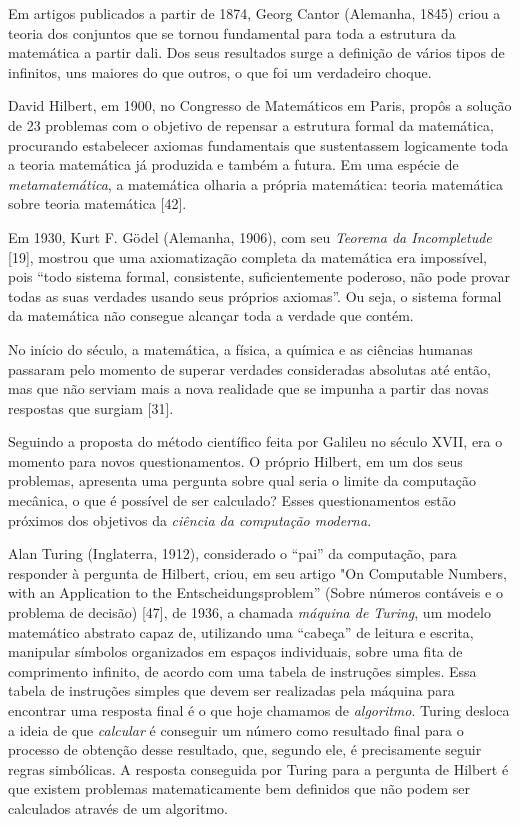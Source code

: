 \documentclass{hipatia}
\begin{document}
Em artigos publicados a partir de 1874, Georg Cantor (Alemanha, 1845) criou a teoria dos conjuntos que se tornou fundamental para toda a estrutura da matemática a partir dali. Dos seus resultados surge a definição de vários tipos de infinitos, uns maiores do que outros, o que foi um verdadeiro choque.

David Hilbert, em 1900, no Congresso de Matemáticos em Paris, propôs a solução de 23 problemas com o objetivo de repensar a estrutura formal da matemática, procurando estabelecer axiomas fundamentais que sustentassem logicamente toda a teoria matemática já produzida e também a futura. Em uma espécie de \textit{metamatemática}, a matemática olharia a própria matemática: teoria matemática sobre teoria matemática [42].

Em 1930, Kurt F. Gödel (Alemanha, 1906), com seu \textit{Teorema da Incompletude} [19], mostrou que uma axiomatização completa da matemática era impossível, pois ``todo sistema formal, consistente, suficientemente poderoso, não pode provar todas as suas verdades usando seus próprios axiomas''. Ou seja, o sistema formal da matemática não consegue alcançar toda a verdade que contém. 

No início do século, a matemática, a física, a química e as ciências humanas passaram pelo momento de superar verdades consideradas absolutas até então, mas que não serviam mais a nova realidade que se impunha a partir das novas respostas que surgiam [31].

Seguindo a proposta do método científico feita por Galileu no século XVII, era o momento para novos questionamentos. O próprio Hilbert, em um dos seus problemas, apresenta uma pergunta  sobre qual seria o limite da computação mecânica, o que é possível de ser calculado? Esses questionamentos estão próximos dos objetivos da \textit{ciência da computação moderna}.

Alan Turing (Inglaterra, 1912), considerado o ``pai'' da computação, para responder à pergunta de Hilbert, criou, em seu artigo "On Computable Numbers, with an Application to the Entscheidungsproblem'' (Sobre números contáveis e o problema de decisão) [47], de 1936, a chamada \textit{máquina de Turing}, um modelo matemático abstrato capaz de, utilizando uma ``cabeça'' de leitura e escrita, manipular símbolos organizados em espaços individuais, sobre uma fita de comprimento infinito, de acordo com uma tabela de instruções simples. Essa tabela de instruções simples que devem ser realizadas pela máquina para encontrar uma resposta final é o que hoje chamamos de \textit{algoritmo}. Turing desloca a ideia de que \textit{calcular} é conseguir um número como resultado final para o processo de obtenção desse resultado, que, segundo ele, é precisamente seguir regras simbólicas. A resposta conseguida por Turing para a pergunta de Hilbert é que existem problemas matematicamente bem definidos que não podem ser calculados através de um algoritmo. 
\end{document}
